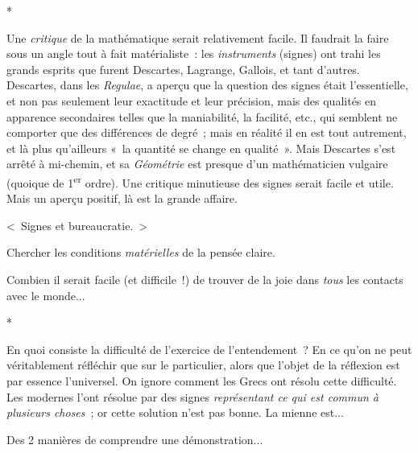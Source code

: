 \documentclass[french,twoside]{book} %
\begin{document}
\begin{center}
*\end{center}
\noindent Une {\itshape critique} de la mathématique serait relativement facile. Il faudrait la faire sous un angle tout à fait matérialiste : les {\itshape instruments} (signes) ont trahi les grands esprits que furent Descartes, Lagrange, Gallois, et tant d'autres. Descartes, dans les {\itshape Regulae}, a aperçu que la question des signes était l'essentielle, et non pas seulement leur exactitude et leur précision, mais des qualités en apparence secondaires telles que la maniabilité, la facilité, etc., qui semblent ne comporter que des différences de degré ; mais en réalité il en est tout autrement, et là plus qu'ailleurs « la quantité se change en qualité ». Mais Descartes s'est arrêté à mi-chemin, et sa {\itshape Géométrie} est presque d'un mathématicien vulgaire (quoique de 1\textsuperscript{er} ordre). Une critique minutieuse des signes serait facile et utile. Mais un aperçu positif, là est la grande affaire.\par
< Signes et bureaucratie. >\par
Chercher les conditions {\itshape matérielles} de la pensée claire.\par
Combien il serait facile (et difficile !) de trouver de la joie dans {\itshape tous} les contacts avec le monde...\par

\begin{center}
*\end{center}
\noindent En quoi consiste la difficulté de l'exercice de l'entendement ? En ce qu'on ne peut véritablement réfléchir que sur le particulier, alors que l'objet de la réflexion est par essence l'universel. On ignore comment les Grecs ont résolu cette difficulté. Les modernes l'ont résolue par des signes {\itshape représentant ce qui est commun à plusieurs choses} ; or cette solution n'est pas bonne. La mienne est...\par
[Descartes aurait vu le décalage formidable entre les {\itshape Regulae} et la {\itshape Géométrie} sans la faute [impardonnable d'avoir rédigé celle-ci en mathématicien vulgaire.]\par
Des 2 manières de comprendre une démonstration...\par
\end{document}
